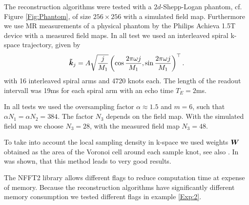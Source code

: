 \documentclass[journal]{IEEEtran}
\newcommand{\zb}[1]{\mbox{\boldmath{${#1}$}}}
\numberwithin{equation}{section}
\numberwithin{table}{section}
\numberwithin{figure}{section}
\begin{document}
The reconstruction algorithms were tested with a $2d$-Shepp-Logan phantom, cf. Figure \ref{Fig:Phantom}, of size $256\times256$ with a simulated field map. Furthermore we use MR measurements of a physical phantom by the Philips Achieva 1.5T device with a measured field maps. In all test we used an interleaved spiral k-space trajectory, given by
\begin{equation*}
\zb {\tilde k}_j = A \sqrt{\frac{j}{M_1}} \left(\cos\frac{2\pi \omega
    j}{M_1}, \sin\frac{2\pi \omega j}{M_1}\right)^{\top}. 
\end{equation*}
with 16 interleaved spiral arms and 4720 knots each.
The length of the readout intervall was 19ms for each spiral arm with an echo time $T_E=2$ms.

In all tests we used the oversampling factor $\alpha \approx 1.5$ and $m=6$, such that $\alpha N_1=\alpha N_2 = 384$. The factor $N_3$ depends on the field map. With the simulated field map we choose $N_3=28$, with the measured field map $N_3=48$.

To take into account the local sampling density in k-space we used weights $\zb W$ obtained as the area of the Voronoi cell around each sample knot, see also \cite{RaPrSiBoEg99,qhull}. In \cite{KnKuPo} was shown, that this method leads to very good results.

The NFFT2 library allows different flags to reduce computation time at expense of memory. Because the reconstruction algorithms have significantly different memory consumption  we tested different flags in example \ref{Exp:2}. 
\end{document}
